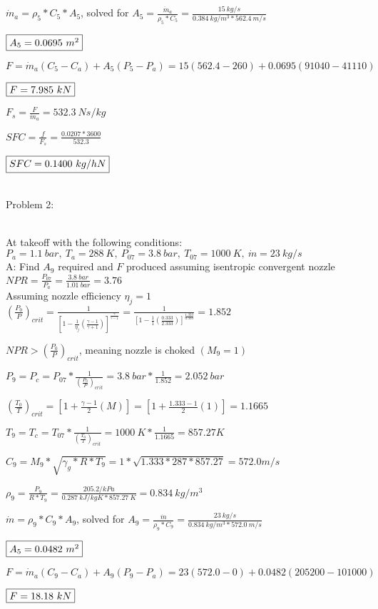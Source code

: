 \documentclass{article}
\begin{document}
$\dot{m}_a=\rho_5*C_5*A_5$, solved for $A_5=\frac{\dot{m}_a}{\rho_5*C_5}=\frac{15\ kg/s}{0.384\ kg/m^3*562.4\ m/s}$

$\fbox{$A_5=0.0695\ m^2$}$

$F=\dot{m}_a(C_5-C_a)+A_5(P_5-P_a)=15(562.4-260)+0.0695(91040-41110)$

$\fbox{$F=7.985\ kN$}$

$F_s=\frac{F}{\dot{m}_a}=532.3\ Ns/kg$

$SFC=\frac{f}{F_s}=\frac{0.0207*3600}{532.3}$

$\fbox{$SFC=0.1400\ kg/hN$}$
\\
\\

\begin{LARGE}
	Problem 2:
\end{LARGE}
\\

At takeoff with the following conditions:
\\

$P_a=1.1\ bar,\ T_a=288\ K,\ P_{07}=3.8\ bar,\ T_{07}=1000\ K,\ \dot{m}=23\ kg/s$
\\

A: Find $A_9$ required and $F$ produced assuming isentropic convergent nozzle
\\

$NPR=\frac{P_{07}}{P_a}=\frac{3.8\ bar}{1.01\ bar}=3.76$
\\

Assuming nozzle efficiency $\eta_j=1$
\\

$(\frac{P_0}{P})_{crit}=\frac{1}{[1-\frac{1}{\eta_j}(\frac{\gamma-1}{\gamma+1})]^{\frac{\gamma}{\gamma-1}}}
=\frac{1}{[1-\frac{1}{1}(\frac{0.333}{2.333})]^{\frac{1.333}{0.333}}}=1.852$

$NPR>(\frac{P_0}{P})_{crit}$, meaning nozzle is choked $(M_9=1)$

$P_9=P_c=P_{07}*\frac{1}{(\frac{P_0}{P})_{crit}}=3.8\ bar*\frac{1}{1.852}=2.052\ bar$

$(\frac{T_0}{T})_{crit}=[1+\frac{\gamma-1}{2}(M)]=[1+\frac{1.333-1}{2}(1)]=1.1665$

$T_9=T_c=T_{07}*\frac{1}{(\frac{T_0}{T})_{crit}}=1000\ K*\frac{1}{1.1665}=857.27K$

$C_9=M_9*\sqrt{\gamma_g*R*T_9}=1*\sqrt{1.333*287*857.27}=572.0 m/s$

$\rho_9=\frac{P_9}{R*T_9}=\frac{205.2/ kPa}{0.287\ kJ/kgK*857.27\ K}=0.834\ kg/m^3$

$\dot{m}=\rho_9*C_9*A_9$, solved for $A_9=\frac{\dot{m}}{\rho_9*C_9}=\frac{23\ kg/s}{0.834\ kg/m^3*572.0\ m/s}$

$\fbox{$A_5=0.0482\ m^2$}$

$F=\dot{m}_a(C_9-C_a)+A_9(P_9-P_a)=23(572.0-0)+0.0482(205200-101000)$

$\fbox{$F=18.18\ kN$}$
\end{document}
